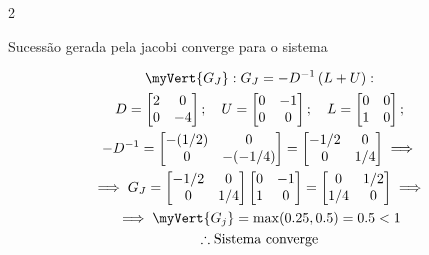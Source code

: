 \documentclass[./CN_A-Tests_Resolutions.tex]{subfiles}
\begin{document}
\begin{questionBox}2{} %

  Sucessão gerada pela jacobi converge para o sistema

  \answer{}

  \begin{gather*}
    \myVert{G_J}:
    G_J=-D^{-1}\,(L+U): \\
    D= \begin{bmatrix}
      2 & 0
      \\ 0 & -4
    \end{bmatrix}
    ; \quad
    U= \begin{bmatrix}
      0 & -1
      \\ 0 & 0
    \end{bmatrix}
    ; \quad
    L= \begin{bmatrix}
      0 & 0
      \\ 1 & 0
    \end{bmatrix}
    ; \\
    -D^{-1}
    = \begin{bmatrix}
      -(1/2) & 0
      \\ 0 & -(-1/4)
    \end{bmatrix}
    = \begin{bmatrix}
      -1/2 & 0
      \\0 & 1/4
    \end{bmatrix}
    \implies \\
    \implies 
    G_J
    =\begin{bmatrix}
      -1/2 & 0
      \\0 & 1/4
    \end{bmatrix}
    \begin{bmatrix}
      0 & -1
      \\ 1 & 0
    \end{bmatrix}
    = \begin{bmatrix}
      0 & 1/2
      \\1/4 & 0
    \end{bmatrix}
    \implies \\
    \implies
    \myVert{G_j}
    = \max(0.25,0.5)=0.5<1
    \\\therefore
    \text{Sistema converge}
  \end{gather*}

\end{questionBox}
\end{document}
